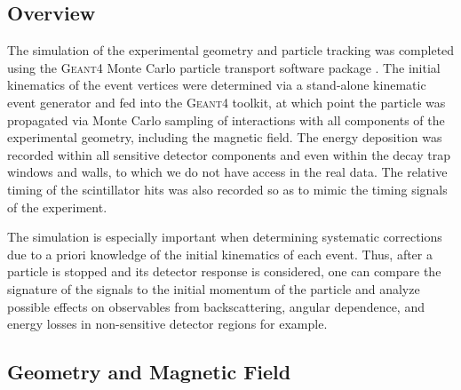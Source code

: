 \subsection{Overview}

The simulation of the experimental geometry and particle tracking was completed
using the \textsc{Geant4} Monte Carlo particle transport software package
\cite{agostinelli2003geant4}. The initial kinematics of the event vertices
were determined via a stand-alone kinematic event generator and fed into the \textsc{Geant4} toolkit, at which
point the particle was propagated via Monte Carlo sampling of interactions
with all components of the experimental geometry, including the magnetic field.
The energy deposition was recorded within all sensitive detector components and
even within the decay trap windows and walls, to which we do not have access
in the real data. The relative timing of the scintillator hits was also
recorded so as to mimic the timing signals of the experiment.

The simulation is especially important when determining systematic corrections due
to a priori knowledge of the initial kinematics of each event. Thus, after a particle
is stopped and its detector response is considered, one can compare the signature
of the signals to the initial momentum of the particle and analyze possible
effects on observables from backscattering, angular dependence, and energy losses
in non-sensitive detector regions for example.

\subsection{Geometry and Magnetic Field} \label{sssec:simMagField}

